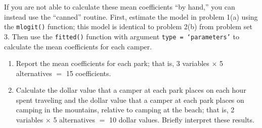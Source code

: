 \documentclass[11pt,letterpaper]{article}
\begin{document}
\begin{enumerate}[label=\alph*., leftmargin=*]
	If you are not able to calculate these mean coefficients ``by hand,'' you can instead use the ``canned'' routine. First, estimate the model in problem 1(a) using the \texttt{mlogit()} function; this model is identical to problem 2(b) from problem set 3. Then use the \texttt{fitted()} function with argument \texttt{type = `parameters'} to calculate the mean coefficients for each camper.

	\begin{enumerate}[label=\roman*.]
		\item Report the mean coefficients for each park; that is, 3 variables $\times$ 5 alternatives $=$ 15 coefficients.

		\item Calculate the dollar value that a camper at each park places on each hour spent traveling and the dollar value that a camper at each park places on camping in the mountains, relative to camping at the beach; that is, 2 variables $\times$ 5 alternatives $=$ 10 dollar values. Briefly interpret these results.
	\end{enumerate}
\end{enumerate}
\end{document}
